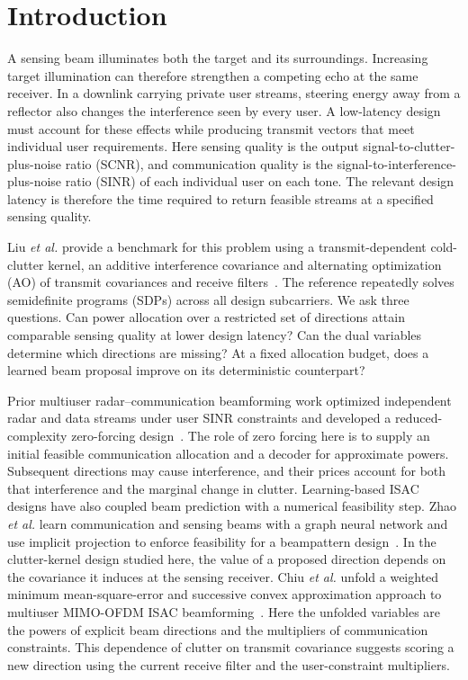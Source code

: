 \documentclass[journal]{IEEEtran}
\begin{document}
\section{Introduction}
A sensing beam illuminates both the target and its surroundings. Increasing target illumination can therefore strengthen a competing echo at the same receiver. In a downlink carrying private user streams, steering energy away from a reflector also changes the interference seen by every user. A low-latency design must account for these effects while producing transmit vectors that meet individual user requirements. Here sensing quality is the output signal-to-clutter-plus-noise ratio (SCNR), and communication quality is the signal-to-interference-plus-noise ratio (SINR) of each individual user on each tone. The relevant design latency is therefore the time required to return feasible streams at a specified sensing quality.

Liu \emph{et al.} provide a benchmark for this problem using a transmit-dependent cold-clutter kernel, an additive interference covariance and alternating optimization (AO) of transmit covariances and receive filters~\cite{liu2026clutter,liuCode}. The reference repeatedly solves semidefinite programs (SDPs) across all design subcarriers. We ask three questions. Can power allocation over a restricted set of directions attain comparable sensing quality at lower design latency? Can the dual variables determine which directions are missing? At a fixed allocation budget, does a learned beam proposal improve on its deterministic counterpart?

Prior multiuser radar--communication beamforming work optimized independent radar and data streams under user SINR constraints and developed a reduced-complexity zero-forcing design~\cite{xiang2020}. The role of zero forcing here is to supply an initial feasible communication allocation and a decoder for approximate powers. Subsequent directions may cause interference, and their prices account for both that interference and the marginal change in clutter.
Learning-based ISAC designs have also coupled beam prediction with a numerical feasibility step. Zhao \emph{et al.} learn communication and sensing beams with a graph neural network and use implicit projection to enforce feasibility for a beampattern design~\cite{zhao}. In the clutter-kernel design studied here, the value of a proposed direction depends on the covariance it induces at the sensing receiver. Chiu \emph{et al.} unfold a weighted minimum mean-square-error and successive convex approximation approach to multiuser MIMO-OFDM ISAC beamforming~\cite{chiu2025mimoofdm}. Here the unfolded variables are the powers of explicit beam directions and the multipliers of communication constraints. This dependence of clutter on transmit covariance suggests scoring a new direction using the current receive filter and the user-constraint multipliers.
\end{document}
